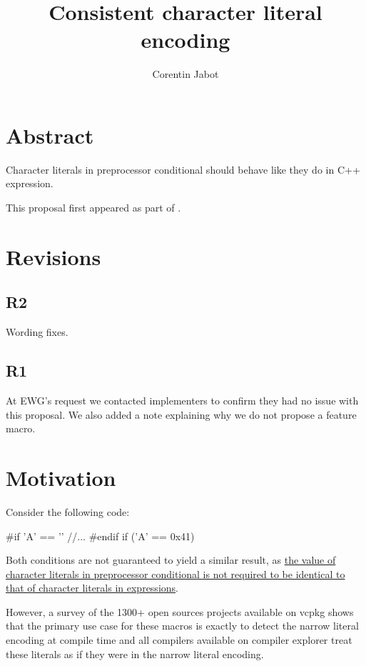 \documentclass{wg21}
\title{	Consistent character literal encoding}
\author{Corentin Jabot}{corentin.jabot@gmail.com}
\begin{document}
\maketitle

\paperquote{}

\section{Abstract}

Character literals in preprocessor conditional should behave like they do in C++ expression.

This proposal first appeared as part of .


\section{Revisions}

\subsection{R2}

Wording fixes.

\subsection{R1}

At EWG's request we contacted implementers to confirm they had no issue with this proposal.
We also added a note explaining why we do not propose a feature macro.

\section{Motivation}

Consider the following code:

\begin{colorblock}
#if 'A' == ''
//...
#endif
if ('A' == 0x41){}
\end{colorblock}

Both conditions are not guaranteed to yield a similar result, as \href{http://eel.is/c++draft/cpp#cond-12}{the value of character literals in preprocessor conditional is not required to be identical to that of character literals in expressions}.

However, a survey of the 1300+ open sources projects available on vcpkg shows that the primary use case for these macros is exactly to detect the
narrow literal encoding at compile time and all compilers available on compiler explorer treat these literals as if they were in the narrow literal encoding.
\end{document}
